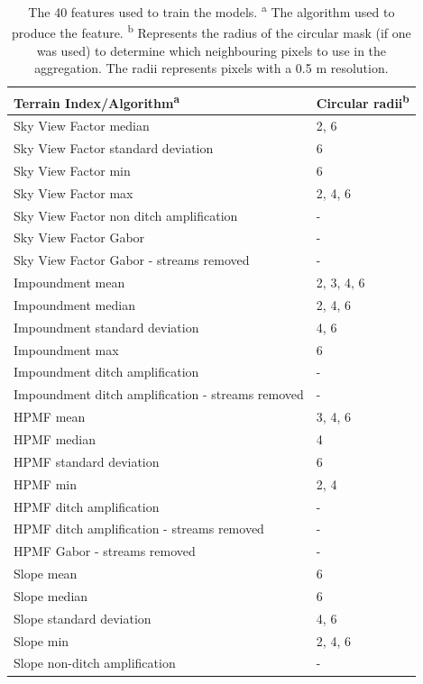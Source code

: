 \documentclass[11pt, review]{elsarticle} %
\begin{document}
\begin{table} [!htb]
\centering
    {\begin{tabular}{l|l}
      \textbf{Terrain Index/Algorithm}\textsuperscript{a} & \textbf{Circular radii}\textsuperscript{b} \\ 
      \hline
      Sky View Factor median &2, 6 \\
      Sky View Factor standard deviation & 6 \\
      Sky View Factor min & 6 \\
      Sky View Factor max & 2, 4, 6 \\
      Sky View Factor non ditch amplification & - \\ 
      Sky View Factor Gabor & - \\
      Sky View Factor Gabor - streams removed & -\\
      
      Impoundment mean & 2, 3, 4, 6 \\
      Impoundment median & 2, 4, 6 \\
      Impoundment standard deviation & 4, 6 \\
      Impoundment max & 6 \\
      Impoundment ditch amplification & - \\
      Impoundment ditch amplification - streams removed & - \\
      
      HPMF mean & 3, 4, 6 \\
      HPMF median & 4 \\
      HPMF standard deviation & 6 \\
      HPMF min & 2, 4 \\
      HPMF ditch amplification & - \\
      HPMF ditch amplification - streams removed & - \\
      HPMF Gabor - streams removed & -\\
      
      Slope mean & 6 \\
      Slope median & 6 \\
      Slope standard deviation & 4, 6 \\
      Slope min & 2, 4, 6 \\
      Slope non-ditch amplification & - \\
      \hline
    \end{tabular}}
    \caption{ The 40 features used to train the models.
    \newline \textsuperscript{a} The algorithm used to produce the feature. \newline
        \textsuperscript{b} Represents the radius of the circular mask (if one was used) to determine which neighbouring pixels to use in the aggregation. The radii represents pixels with a 0.5 m resolution.}
    \label{featuretable}
\end{table}
\end{document}

